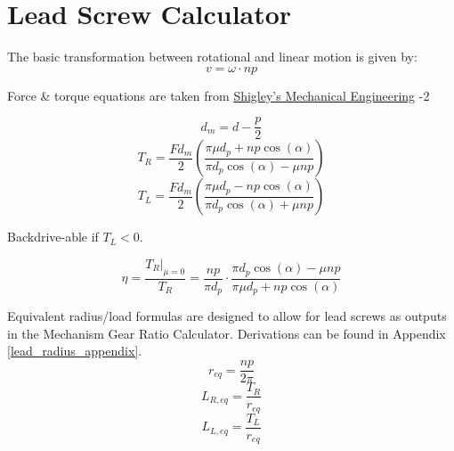 \documentclass[11pt,a4paper,titlepage]{article}
\begin{document}
	\newpage
	\section{Lead Screw Calculator}
	
	The basic transformation between rotational and linear motion is given by:
	\begin{equation} \label{lead_screw_lin_rot}
	v = \omega \cdot n p
	\end{equation}
	
	Force \& torque equations are taken from \href{https://fac.ksu.edu.sa/sites/default/files/mechanical-disgin-shigley.pdf}{Shigley's Mechanical Engineering} -2
	
	\begin{equation}
	d_m = d - \frac{p}{2}
	\end{equation}
	\begin{equation}
	T_R = \frac{F d_m}{2} \left( \frac{\pi \mu d_p + n p \cos(\alpha)}{\pi d_p \cos(\alpha) - \mu n p} \right)
	\end{equation}
	\begin{equation}
	T_L = \frac{F d_m}{2} \left( \frac{\pi \mu d_p - n p \cos(\alpha)}{\pi d_p \cos(\alpha) + \mu n p} \right)
	\end{equation}
	\begin{center}
		Backdrive-able if $T_L < 0$.
	\end{center}
	\begin{equation}
	\eta = \frac{T_R |_{\mu=0}}{T_R} = \frac{n p}{\pi d_p} \cdot \frac{\pi d_p \cos(\alpha) - \mu n p}{\pi \mu d_p + n p \cos(\alpha)}
	\end{equation}
	
	Equivalent radius/load formulas are designed to allow for lead screws as outputs in the Mechanism Gear Ratio Calculator. Derivations can be found in Appendix \ref{lead_radius_appendix}.
	\begin{equation} \label{r_eq}
	r_{eq} = \frac{n p}{2 \pi}
	\end{equation}
	\begin{equation}
	L_{R,eq} = \frac{T_R}{r_{eq}}
	\end{equation}
	\begin{equation}
	L_{L,eq} = \frac{T_L}{r_{eq}}
	\end{equation}
	\bigskip
	
\end{document}

